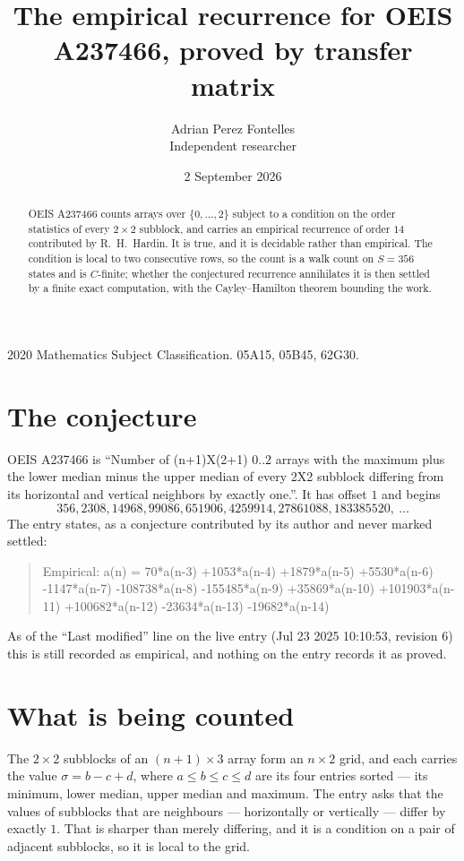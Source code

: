 \documentclass[11pt,a4paper]{article}
\title{The empirical recurrence for OEIS A237466, proved by transfer matrix}
\author{Adrian Perez Fontelles\\ \small Independent researcher}
\date{2 September 2026}
\theoremstyle{plain}
\theoremstyle{definition}
\begin{document}
\maketitle

\begin{abstract}
OEIS A237466 counts arrays over $\{0,\dots,2\}$ subject to a condition on the order
statistics of every $2\times2$ subblock, and carries an empirical recurrence of order
$14$ contributed by R.~H.~Hardin. It is true, and it is decidable rather than empirical.
The condition is local to two consecutive rows, so the count is a walk count on $S=356$
states and is $C$-finite; whether the conjectured recurrence annihilates it is then settled by
a finite exact computation, with the Cayley--Hamilton theorem bounding the work.
\end{abstract}

\noindent\small 2020 Mathematics Subject Classification. 05A15, 05B45, 62G30.\normalsize

\section{The conjecture}

OEIS A237466 is ``Number of (n+1)X(2+1) 0..2 arrays with the maximum plus the lower median minus the upper median of every 2X2 subblock differing from its horizontal and vertical neighbors by exactly one.''. It has offset $1$ and begins
\[
356, 2308, 14968, 99086, 651906, 4259914, 27861088, 183385520,\ \dots
\]
The entry states, as a conjecture contributed by its author and never marked settled:
\begin{quote}
Empirical: a(n) = 70*a(n-3) +1053*a(n-4) +1879*a(n-5) +5530*a(n-6) -1147*a(n-7) -108738*a(n-8) -155485*a(n-9) +35869*a(n-10) +101903*a(n-11) +100682*a(n-12) -23634*a(n-13) -19682*a(n-14)
\end{quote}
As of the ``Last modified'' line on the live entry (Jul 23 2025 10:10:53, revision 6) this is still
recorded as empirical, and nothing on the entry records it as proved.

\section{What is being counted}

The $2\times2$ subblocks of an $(n+1)\times3$ array form an
$n\times2$ grid, and each carries the value $\sigma=b-c+d$, where $a\le b\le c\le d$ are its four entries sorted --- its minimum, lower median, upper median and maximum. The entry asks that the values of
subblocks that are neighbours --- horizontally or vertically --- differ by exactly $1$.
That is sharper than merely differing, and it is a condition on a pair of adjacent subblocks,
so it is local to the grid.
\end{document}
